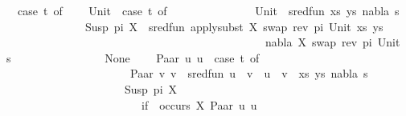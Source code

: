 \begin{isabellebody}
\ \ {\isacharparenleft}{\kern0pt}case\ t{}\ of\isanewline
\ \ \ \ Unit\ {\isasymRightarrow}\ {\isacharparenleft}{\kern0pt}case\ t{}\ of\isanewline
\ \ \ \ \ \ \ \ \ \ \ \ \ \ \ Unit\ {\isasymRightarrow}\ sred{\isacharunderscore}{\kern0pt}fun\ {\isacharparenleft}{\kern0pt}{\isacharparenleft}{\kern0pt}xs{\isacharcomma}{\kern0pt}\ ys{\isacharparenright}{\kern0pt}{\isacharcomma}{\kern0pt}\ nabla{\isacharcomma}{\kern0pt}\ s{\isacharparenright}{\kern0pt}\isanewline
\ \ \ \ \ \ \ \ \ \ \ \ \ {\isacharbar}{\kern0pt}\ Susp\ pi\ X\ {\isasymRightarrow}\ sred{\isacharunderscore}{\kern0pt}fun\ {\isacharparenleft}{\kern0pt}apply{\isacharunderscore}{\kern0pt}subst\ {\isacharbrackleft}{\kern0pt}{\isacharparenleft}{\kern0pt}X{\isacharcomma}{\kern0pt}\ swap\ {\isacharparenleft}{\kern0pt}rev\ pi{\isacharparenright}{\kern0pt}\ Unit{\isacharparenright}{\kern0pt}{\isacharbrackright}{\kern0pt}\ {\isacharparenleft}{\kern0pt}xs{\isacharcomma}{\kern0pt}\ ys{\isacharparenright}{\kern0pt}{\isacharcomma}{\kern0pt}\isanewline
\ \ \ \ \ \ \ \ \ \ \ \ \ \ \ \ \ \ \ \ \ \ \ \ \ \ \ \ \ \ \ \ \ \ \ \ \ \ \ \ \ \ \ \ \ \ nabla{\isacharcomma}{\kern0pt}\ {\isacharbrackleft}{\kern0pt}{\isacharparenleft}{\kern0pt}X{\isacharcomma}{\kern0pt}\ swap\ {\isacharparenleft}{\kern0pt}rev\ pi{\isacharparenright}{\kern0pt}\ Unit{\isacharparenright}{\kern0pt}{\isacharbrackright}{\kern0pt}\ {\isasymbullet}\ s{\isacharparenright}{\kern0pt}\isanewline
\ \ \ \ \ \ \ \ \ \ \ \ \ {\isacharbar}{\kern0pt}\ {\isacharunderscore}{\kern0pt}\ {\isasymRightarrow}\ None{\isacharparenright}{\kern0pt}\isanewline
\ \ \ {\isacharbar}{\kern0pt}\ Paar\ u{}\ u{}\ {\isasymRightarrow}\ {\isacharparenleft}{\kern0pt}case\ t{}\ of\isanewline
\ \ \ \ \ \ \ \ \ \ \ \ \ \ \ \ \ \ \ \ \ \ Paar\ v{}\ v{}\ {\isasymRightarrow}\ sred{\isacharunderscore}{\kern0pt}fun\ {\isacharparenleft}{\kern0pt}{\isacharparenleft}{\kern0pt}{\isacharparenleft}{\kern0pt}u{}\ {\isasymapprox}{\isacharquery}{\kern0pt}\ v{}{\isacharparenright}{\kern0pt}\ {\isacharhash}{\kern0pt}\ {\isacharparenleft}{\kern0pt}u{}\ {\isasymapprox}{\isacharquery}{\kern0pt}\ v{}{\isacharparenright}{\kern0pt}\ {\isacharhash}{\kern0pt}\ xs{\isacharcomma}{\kern0pt}\ ys{\isacharparenright}{\kern0pt}{\isacharcomma}{\kern0pt}\ nabla{\isacharcomma}{\kern0pt}\ s{\isacharparenright}{\kern0pt}\isanewline
\ \ \ \ \ \ \ \ \ \ \ \ \ \ \ \ \ \ \ \ {\isacharbar}{\kern0pt}\ Susp\ pi\ X\ {\isasymRightarrow}\isanewline
\ \ \ \ \ \ \ \ \ \ \ \ \ \ \ \ \ \ \ \ \ \ \ \ if\ {\isasymnot}\ occurs\ X\ {\isacharparenleft}{\kern0pt}Paar\ u{}\ u{}{\isacharparenright}{\kern0pt}\isanewline

\end{isabellebody}
